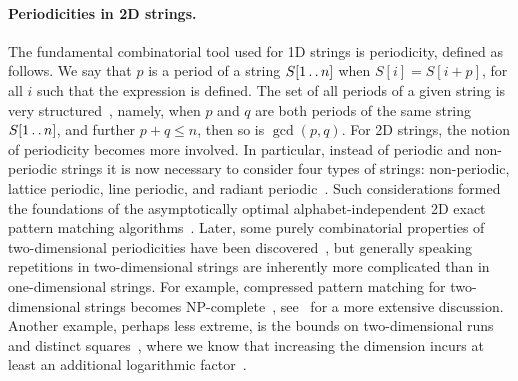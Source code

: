 \documentclass[a4paper,11pt]{article}
\def\dd{\mathinner{.\,.}}
\begin{document}
\paragraph{Periodicities in 2D strings.} The fundamental combinatorial tool used for 1D strings is periodicity,
defined as follows. We say that $p$ is a period of a string $S[1 \dd n]$ when $S[i]=S[i+p]$, for all $i$ such that the expression is defined.
The set of all periods of a given string is very structured~\cite{Fine1965}, namely, when $p$ and $q$ are both periods
of the same string $S[1 \dd n]$, and further $p+q\leq n$, then so is $\gcd(p,q)$.
For 2D strings, the notion of periodicity becomes more involved. In particular, instead of periodic
and non-periodic strings it is now necessary to consider four types of strings: non-periodic, lattice periodic, line periodic, and
radiant periodic~\cite{Amir1998}. Such considerations formed the foundations of the asymptotically optimal alphabet-independent
2D exact pattern matching algorithms~\cite{Amir1994,Galil1996}.
Later, some purely combinatorial properties of two-dimensional periodicities have been discovered~\cite{Mignosi2003,Gamard2017},
but generally speaking repetitions in two-dimensional strings are inherently more complicated than in one-dimensional strings.
For example, compressed pattern matching for two-dimensional strings becomes NP-complete~\cite{Berman2002}, see~\cite{Rytter2000}
for a more extensive discussion.
Another example, perhaps less extreme, is the bounds on two-dimensional runs~\cite{Amir2020} and
distinct squares~\cite{Charalampopoulos2020}, where we know that increasing the dimension incurs at least an additional
logarithmic factor~\cite{Charalampopoulos2020}.
\end{document}
